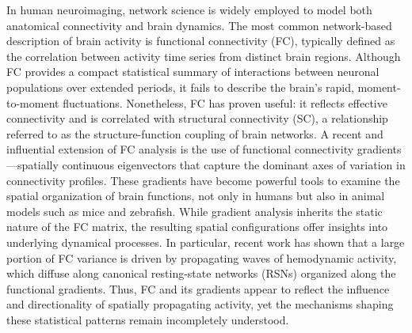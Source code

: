 \documentclass{article}
\begin{document}
In human neuroimaging, network science is widely employed to model both anatomical connectivity and brain dynamics\cite{bassett2017network}. The most common network-based description of brain activity is functional connectivity (FC), typically defined as the correlation between activity time series from distinct brain regions. Although FC provides a compact statistical summary of interactions between neuronal populations over extended periods, it fails to describe the brain’s rapid, moment-to-moment fluctuations\cite{zamani2020high}. Nonetheless, FC has proven useful: it reflects effective connectivity and is correlated with structural connectivity (SC), a relationship referred to as the structure-function coupling of brain networks\cite{fotiadis2024structure}. A recent and influential extension of FC analysis is the use of functional connectivity gradients---spatially continuous eigenvectors that capture the dominant axes of variation in connectivity profiles\cite{margulies2016situating, huntenburg2018large, bernhardt2022gradients}. These gradients have become powerful tools to examine the spatial organization of brain functions, not only in humans but also in animal models such as mice and zebrafish\cite{coletta2020network, legare2024structural}. While gradient analysis inherits the static nature of the FC matrix, the resulting spatial configurations offer insights into underlying dynamical processes. In particular, recent work has shown that a large portion of FC variance is driven by propagating waves of hemodynamic activity, which diffuse along canonical resting-state networks (RSNs) organized along the functional gradients\cite{yousefi2021propagating, raut2021global}. Thus, FC and its gradients appear to reflect the influence and directionality of spatially propagating activity, yet the mechanisms shaping these statistical patterns remain incompletely understood.
\end{document}
